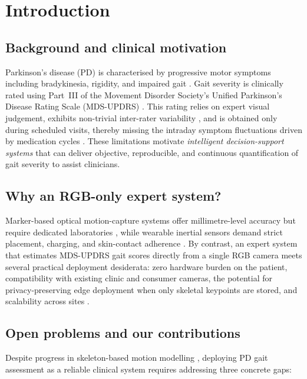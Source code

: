 \documentclass[preprint,12pt]{elsarticle}
\begin{document}
\section{Introduction}
\label{sec:intro}

\subsection{Background and clinical motivation}
Parkinson's disease (PD) is characterised by progressive motor symptoms
including bradykinesia, rigidity, and impaired gait \cite{goetz2008mds}.
Gait severity is clinically rated using Part~III of the Movement Disorder
Society's Unified Parkinson's Disease Rating Scale (MDS-UPDRS)
\cite{martinez2011mds}. This rating relies on expert visual judgement,
exhibits non-trivial inter-rater variability \cite{richards1994inter}, and
is obtained only during scheduled visits, thereby missing the intraday
symptom fluctuations driven by medication cycles \cite{zhang2024wearable}.
These limitations motivate \emph{intelligent decision-support systems} that
can deliver objective, reproducible, and continuous quantification of gait
severity to assist clinicians.

\subsection{Why an RGB-only expert system?}
Marker-based optical motion-capture systems offer millimetre-level accuracy
but require dedicated laboratories \cite{dibiase2020gait}, while wearable
inertial sensors demand strict placement, charging, and skin-contact
adherence \cite{zhang2024wearable}. By contrast, an expert system that
estimates MDS-UPDRS gait scores directly from a single RGB camera meets
several practical deployment desiderata: zero hardware burden on the patient,
compatibility with existing clinic and consumer cameras, the potential for
privacy-preserving edge deployment when only skeletal keypoints are stored,
and scalability across sites \cite{sun2024digital}.

\subsection{Open problems and our contributions}
Despite progress in skeleton-based motion modelling
\cite{shi2019twoStream,zhu2023motionbert}, deploying PD gait assessment as a
reliable clinical system requires addressing three concrete gaps:
\end{document}
